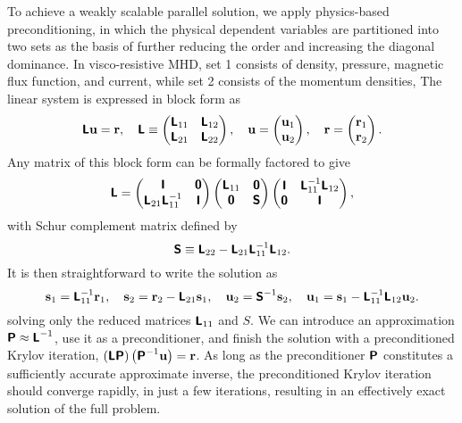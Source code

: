 \documentclass{report}
\begin{document}
To achieve a weakly scalable parallel solution, we apply physics-based
preconditioning, in which the physical dependent variables are
partitioned into two sets as the basis of further reducing the order and
increasing the diagonal dominance. In visco-resistive MHD, set 1
consists of density, pressure, magnetic flux function, and current,
while set 2 consists of the momentum densities, The linear system is
expressed in block form as
\begin{equation}
\t{L} \v{u} = \v{r}, \quad
\t{L} \equiv \left( \begin{matrix} \t{L}_{11} & \t{L}_{12} \\
\t{L}_{21} & \t{L}_{22} \end{matrix} \right), \quad
\v{u} = \left( \begin{matrix} \v{u}_1 \\ \v{u}_2 \end{matrix} \right), \quad
\v{r} = \left( \begin{matrix} \v{r}_1 \\ \v{r}_2 \end{matrix} \right).
\nonumber
\end{equation}
Any matrix of this block form can be formally factored to give
\begin{equation}
\t{L} = \left( \begin{matrix} \t{I} & \t{0} \\
\t{L}_{21} \t{L}_{11}^{-1} & \t{I} \end{matrix} \right)
\left( \begin{matrix} \t{L}_{11} & \t{0} \\ \t{0} & \t{S} \end{matrix} \right)
\left( \begin{matrix} \t{I} & \t{L}_{11}^{-1} \t{L}_{12}
\\ \t{0} & \t{I} \end{matrix} \right),
\nonumber
\end{equation}
with Schur complement matrix defined by
\begin{equation}
\t{S} \equiv \t{L}_{22} - \t{L}_{21} \t{L}_{11}^{-1} \t{L}_{12}.
\nonumber
\end{equation}
It is then straightforward to write the solution as
\begin{equation}
\v{s}_1 = \t{L}_{11}^{-1} \v{r}_1, \quad
\v{s}_2 = \v{r}_2 - \t{L}_{21} \v{s}_1, \quad
\v{u}_2 = \t{S}^{-1} \v{s}_2, \quad
\v{u}_1 = \v{s}_1 - \t{L}_{11}^{-1} \t{L}_{12} \v{u}_2.
\nonumber
\end{equation}
solving only the reduced matrices $\t{L}_{11}$ and $S$. We can
introduce an approximation $\t{P} \approx \t{L}^{-1}$, use it as a
preconditioner, and finish the solution with a preconditioned Krylov
iteration, $\left( \t{L} \t{P} \right) \left( \t{P}^{-1} \v{u} \right) =
\v{r}$. As long as the preconditioner $\t{P}$ constitutes a
sufficiently accurate approximate inverse, the preconditioned Krylov
iteration should converge rapidly, in just a few iterations, resulting
in an effectively exact solution of the full problem.
\end{document}
